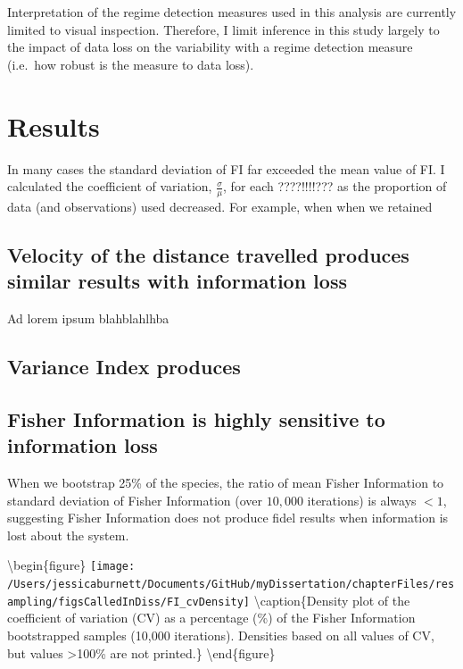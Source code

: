 \documentclass[12pt,twoside,openany]{reedthesis}
\begin{document}
Interpretation of the regime detection measures used in this analysis are currently limited to visual inspection. Therefore, I limit inference in this study largely to the impact of data loss on the variability with a regime detection measure (i.e.~how robust is the measure to data loss).

\hypertarget{results-1}{%
\section{Results}\label{results-1}}

In many cases the standard deviation of FI far exceeded the mean value of FI. I calculated the coefficient of variation, \(\frac{\sigma}{\mu}\), for each ????!!!!??? as the proportion of data (and observations) used decreased. For example, when when we retained

\hypertarget{velocity-of-the-distance-travelled-produces-similar-results-with-information-loss}{%
\subsection{Velocity of the distance travelled produces similar results with information loss}\label{velocity-of-the-distance-travelled-produces-similar-results-with-information-loss}}

Ad lorem ipsum blahblahlhba

\hypertarget{variance-index-produces}{%
\subsection{Variance Index produces}\label{variance-index-produces}}

\hypertarget{fisher-information-is-highly-sensitive-to-information-loss}{%
\subsection{Fisher Information is highly sensitive to information loss}\label{fisher-information-is-highly-sensitive-to-information-loss}}

When we bootstrap 25\% of the species, the ratio of mean Fisher Information to standard deviation of Fisher Information (over \(10,000\) iterations) is always \(< 1\), suggesting Fisher Information does not produce fidel results when information is lost about the system.

\textbackslash begin\{figure\}
\texttt{[image: /Users/jessicaburnett/Documents/GitHub/myDissertation/chapterFiles/resampling/figsCalledInDiss/FI\_cvDensity]} \textbackslash caption\{Density plot of the coefficient of variation (CV) as a percentage (\%) of the Fisher Information bootstrapped samples (10,000 iterations). Densities based on all values of CV, but values \textgreater100\% are not printed.\}\label{fig:results}
\textbackslash end\{figure\}
\end{document}
